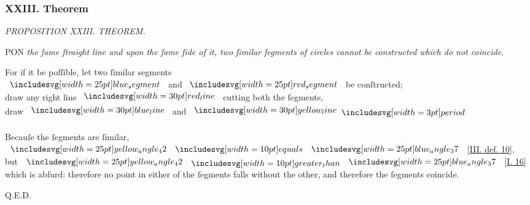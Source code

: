 \documentclass[11pt,preview]{standalone}
\begin{document}
\subsubsection{XXIII. Theorem}

\begin{minipage}[t]{0.54\textwidth}
    \begin{center}
        \textit{PROPOSITION XXIII. THEOREM.}\label{book3pr23} \\
    \end{center}

    \hfill

    \begin{center}
        \raggedright \lettrine[lines=3, loversize=1, nindent=0pt]{}{}PON \textit{the ſame ſtraight line and upon the ſame ſide of it, two ſimilar ſegments of circles cannot be constructed which do not coincide}.
    \end{center}
\end{minipage}%
\hfill
\begin{minipage}[t]{0.43\textwidth}
    \vspace{20pt}
    
\end{minipage}%

\hfill

\hfill

\begin{center}
    For if it be poſſible, let two ſimilar segments\\
    $\img{blue_segment}$ and $\img{red_segment}$ be conſtructed;\\
    draw any right line $\redline$ cutting both the ſegments,\\
    draw $\blueline$ and $\yellowline \bperiod$\\
    \hfill\\
    Becauſe the ſegments are ſimilar,\\
    $\img{yellow_angle_42} \bequals \img{blue_angle_37}$ [\hyperref[book3def10]{\textsc{III.} def. 10}],\\
    but $\img{yellow_angle_42} \bgt \img{blue_angle_37}$ [\hyperref[book1pr16]{\textsc{I.} 16}]\\
    \vspace{1ex}
    which is abſurd: therefore no point in either of the ſegments falls without the other, and therefore the ſegments coincide.
\end{center}

\hfill

\hfill Q.E.D.
\end{document}
